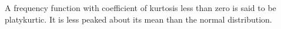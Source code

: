 A frequency function with coefficient of kurtosis less than zero is said to be
platykurtic. It is less peaked about its mean than the normal distribution.